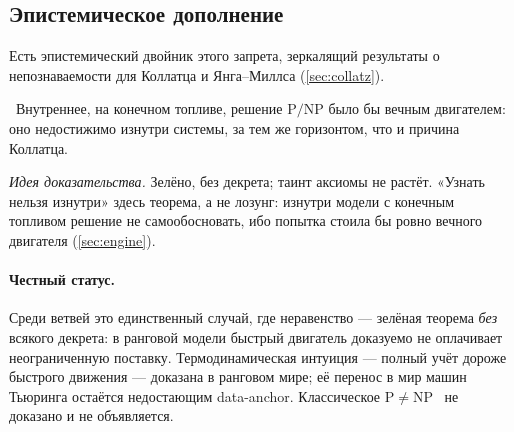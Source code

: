 \subsection{Эпистемическое дополнение}

Есть эпистемический двойник этого запрета, зеркалящий результаты о непознаваемости для Коллатца и
Янга--Миллса (\cref{sec:collatz}).

\begin{theorem}\label{thm:pnpCause_unknowable}
\green{}\ Внутреннее, на конечном топливе, решение $\mathrm{P}/\mathrm{NP}$ было бы вечным
двигателем: оно недостижимо изнутри системы, за тем же горизонтом, что и причина Коллатца.
\end{theorem}

\emph{Идея доказательства.} Зелёно, без декрета; таинт аксиомы не растёт. «Узнать нельзя изнутри»
здесь теорема, а не лозунг: изнутри модели с конечным топливом решение не самообосновать, ибо
попытка стоила бы ровно вечного двигателя (\cref{sec:engine}).

\paragraph{Честный статус.}
Среди ветвей это единственный случай, где неравенство --- зелёная теорема \emph{без} всякого
декрета: в ранговой модели быстрый двигатель доказуемо не оплачивает неограниченную поставку.
Термодинамическая интуиция --- полный учёт дороже быстрого движения --- доказана в ранговом мире;
её перенос в мир машин Тьюринга остаётся недостающим data-anchor. Классическое
$\mathrm{P}\neq\mathrm{NP}$~\cite{clay-pnp} не доказано и не объявляется.

